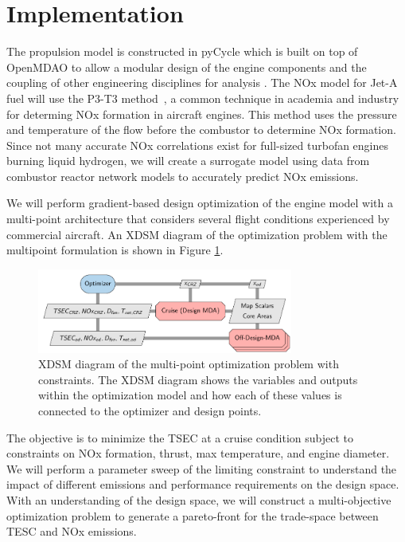 \documentclass[conf]{new-aiaa}
\begin{document}
\section{Implementation}
\label{sec:imp}
The propulsion model is constructed in pyCycle which is built on top of OpenMDAO to allow a modular design of the engine components and the coupling of other engineering disciplines for analysis \cite{Gray2019a}.
The NOx model for Jet-A fuel will use the P3-T3 method~\cite{Dubois2006}, a common technique in academia and industry for determing NOx formation in aircraft engines.
This method uses the pressure and temperature of the flow before the combustor to determine NOx formation.
Since not many accurate NOx correlations exist for full-sized turbofan engines burning liquid hydrogen, we will create a surrogate model using data from combustor reactor network models to accurately predict NOx emissions.

We will perform gradient-based design optimization of the engine model with a multi-point architecture that considers several flight conditions experienced by commercial aircraft.
An XDSM diagram of the optimization problem with the multipoint formulation is shown in Figure \ref{fig:opt_prob}.

\begin{figure}[!hbt]
	\centering
	\includegraphics[width=0.75\textwidth]{N3_inject.pdf}
	\caption{XDSM diagram of the multi-point optimization problem with constraints.
		The XDSM diagram shows the variables and outputs within the optimization model and how each of these values is connected to the optimizer and design points.}
	\label{fig:opt_prob}
\end{figure}

The objective is to minimize the TSEC at a cruise condition subject to constraints on NOx formation, thrust, max temperature, and engine diameter.
We will perform a parameter sweep of the limiting constraint to understand the impact of different emissions and performance requirements on the design space.
With an understanding of the design space, we will construct a multi-objective optimization problem to generate a pareto-front for the trade-space between TESC and NOx emissions.
\end{document}
